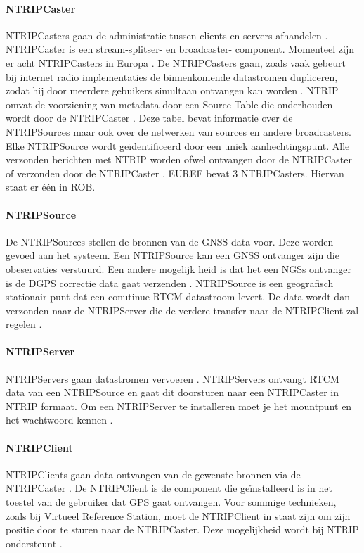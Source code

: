 \paragraph{NTRIPCaster}
 NTRIPCasters gaan de administratie tussen clients en servers afhandelen \cite{LBibGPS}. NTRIPCaster is een stream-splitser- en broadcaster- component. Momenteel zijn er acht NTRIPCasters in Europa \cite{LBibNTRIP}. De NTRIPCasters gaan, zoals vaak gebeurt bij internet radio implementaties de binnenkomende datastromen dupliceren, zodat hij door meerdere gebuikers simultaan ontvangen kan worden \cite{LBibNTRIP2}. NTRIP omvat de voorziening van metadata door een Source Table die onderhouden wordt door de NTRIPCaster \cite{LBibNTRIP3}. Deze tabel bevat informatie over de NTRIPSources maar ook over de netwerken van sources en andere broadcasters. Elke NTRIPSource wordt ge\"identificeerd door een uniek aanhechtingspunt. Alle verzonden berichten met NTRIP worden ofwel ontvangen door de NTRIPCaster of verzonden door de NTRIPCaster \cite{LBibNTRIP4}. EUREF bevat 3 NTRIPCasters. Hiervan staat er \'e\'en in ROB. 
 
\paragraph{NTRIPSource}
De NTRIPSources stellen de bronnen van de GNSS data voor. Deze worden gevoed aan het systeem. Een  NTRIPSource kan een GNSS ontvanger zijn die obeservaties verstuurd. Een andere mogelijk heid is dat het een NGSs ontvanger is de DGPS correctie data gaat verzenden \cite{LBibNTRIP3}. NTRIPSource is een geografisch stationair punt dat een conutinue RTCM datastroom levert. De data wordt dan verzonden naar de NTRIPServer die de verdere transfer naar de NTRIPClient zal regelen \cite{LBibNTRIP4}.

\paragraph{NTRIPServer}
NTRIPServers gaan datastromen vervoeren \cite{LBibGPS}. NTRIPServers ontvangt RTCM data van een NTRIPSource en gaat dit doorsturen naar een NTRIPCaster in NTRIP formaat. Om een NTRIPServer te installeren moet je het mountpunt en het wachtwoord kennen \cite{LBibNTRIP4}.
 
\paragraph{NTRIPClient}
NTRIPClients gaan data ontvangen van de gewenste bronnen via de NTRIPCaster \cite{LBibNTRIP}. De NTRIPClient is de component die ge\"installeerd is in het toestel van de gebruiker dat GPS gaat ontvangen. Voor sommige technieken, zoals bij Virtueel Reference Station, moet de NTRIPClient in staat zijn om zijn positie door te sturen naar de NTRIPCaster. Deze mogelijkheid wordt bij NTRIP ondersteunt \cite{LBibNTRIP4}.



